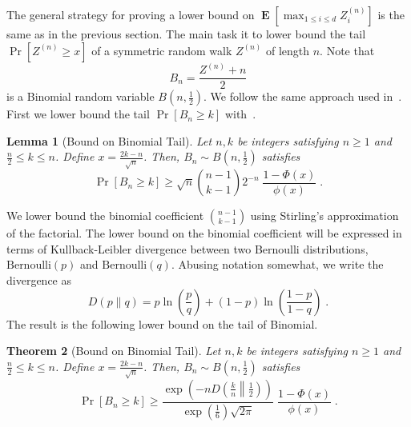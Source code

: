 \documentclass{article}
\DeclareMathOperator*{\Exp}{\mathbf{E}}
\newtheorem{theorem}{Theorem}
\newtheorem{lemma}[theorem]{Lemma}
\begin{document}
The general strategy for proving a lower bound on $\Exp\left[\max_{1 \le i \le d} Z^{(n)}_i \right]$
 is the same as in the previous section. The main task it to lower bound the
tail $\Pr[Z^{(n)} \ge x]$ of a symmetric random walk $Z^{(n)}$ of length
$n$.  Note that
$$
B_n = \frac{Z^{(n)} + n}{2}
$$
is a Binomial random variable $B(n,\frac{1}{2})$. We follow the same approach used in~\cite{nOrabona13}.
First we lower bound the tail $\Pr[B_n \ge k]$ with~\citet[Theorem 2]{McKay1989}.
\begin{lemma}[Bound on Binomial Tail]
\label{lemma:mckay}
Let $n,k$ be integers satisfying $n \ge 1$ and $\frac{n}{2} \le k \le n$. Define $x = \frac{2k - n}{\sqrt{n}}$. Then, $B_n \sim B(n,\frac{1}{2})$ satisfies
$$
\Pr \left[ B_n \ge  k \right] \ge \sqrt{n} \binom{n-1}{k-1} 2^{-n}
 \; \frac{1 - \Phi(x)}{\phi(x)} \; .
$$
\end{lemma}
We lower bound the binomial coefficient
$\binom{n-1}{k-1}$ using Stirling's approximation of the factorial. The lower
bound on the binomial coefficient will be expressed in terms of
Kullback-Leibler divergence between two Bernoulli distributions,
$\text{Bernoulli}(p)$ and $\text{Bernoulli}(q)$. Abusing notation somewhat,
we write the divergence as
$$
D(p\|q) = p \ln \left( \frac{p}{q} \right) + (1-p) \ln \left( \frac{1-p}{1-q} \right) \; .
$$
The result is the following lower bound on the tail of Binomial.
\begin{theorem}[Bound on Binomial Tail]
\label{theorem:binomial}
Let $n,k$ be integers satisfying $n \ge 1$ and $\frac{n}{2} \le k \le n$. Define $x = \frac{2k - n}{\sqrt{n}}$. Then, $B_n \sim B(n,\frac{1}{2})$ satisfies
$$
\Pr \left[ B_n \ge  k \right] \ge \frac{\exp\left(-n D \left(\frac{k}{n} \middle\| \frac{1}{2} \right)\right)}{\exp\left(\frac{1}{6}\right) \sqrt{2 \pi}} \; \frac{1 - \Phi(x)}{\phi(x)} \; .
$$
\end{theorem}
%
\end{document}
